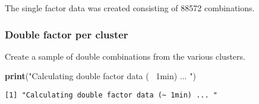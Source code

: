 \documentclass[]{article}
\newenvironment{Shaded}{\begin{snugshade}}{\end{snugshade}}
\newcommand{\KeywordTok}[1]{\textcolor[rgb]{0.13,0.29,0.53}{\textbf{{#1}}}}
\newcommand{\DecValTok}[1]{\textcolor[rgb]{0.00,0.00,0.81}{{#1}}}
\newcommand{\StringTok}[1]{\textcolor[rgb]{0.31,0.60,0.02}{{#1}}}
\newcommand{\CommentTok}[1]{\textcolor[rgb]{0.56,0.35,0.01}{\textit{{#1}}}}
\newcommand{\NormalTok}[1]{{#1}}
\begin{document}
\begin{Shaded}
\end{Shaded}

The single factor data was created consisting of 88572 combinations.

\subsubsection{Double factor per
cluster}\label{double-factor-per-cluster}

Create a sample of double combinations from the various clusters.

\begin{Shaded}
\begin{Highlighting}[]
\KeywordTok{print}\NormalTok{(}\StringTok{"Calculating double factor data (~ 1min) ... "}\NormalTok{)}
\end{Highlighting}
\end{Shaded}

\begin{verbatim}
[1] "Calculating double factor data (~ 1min) ... "
\end{verbatim}
\end{document}
